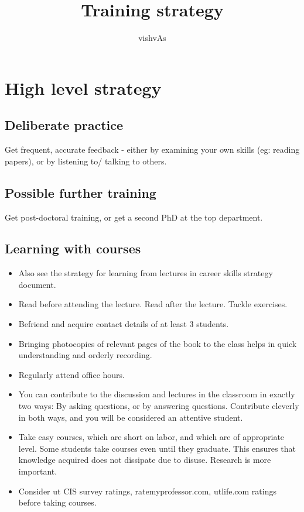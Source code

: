 \documentclass[oneside, article]{memoir}
\title{Training strategy}
\author{vishvAs}
\begin{document}
\maketitle


\chapter{High level strategy}
\section{Deliberate practice}
Get frequent, accurate feedback - either by examining your own skills (eg: reading papers), or by listening to/ talking to others.

\section{Possible further training}
Get post-doctoral training, or get a second PhD at the top department.

\section{Learning with courses}
\begin{itemize}
\item Also see the strategy for learning from lectures in career skills strategy document.
\item Read before attending the lecture. Read after the lecture. Tackle exercises.
\item Befriend and acquire contact details of at least 3 students.
\item Bringing photocopies of relevant pages of the book to the class helps in quick understanding and orderly recording.
\item Regularly attend office hours.
\item You can contribute to the discussion and lectures in the classroom in exactly two ways: By asking questions, or by answering questions. Contribute cleverly in both ways, and you will be considered an attentive student.
\item Take easy courses, which are short on labor, and which are of appropriate level. Some students take courses even until they graduate. This ensures that knowledge acquired does not dissipate due to disuse. Research is more important.
\item Consider ut CIS survey ratings, ratemyprofessor.com, utlife.com ratings before taking courses.
\end{itemize}
\end{document}
